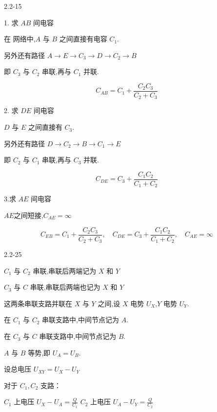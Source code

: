 \documentclass{article}
\begin{document}
2.2-15 %




1. 求 $ AB $ 间电容

在 网络中,$ A$ 与 $ B $ 之间直接有电容 $ C_1 $.  

另外还有路径 $ A \to E  \to  C_3 \to D \to C_2 \to  B $

即 $ C_3 $ 与 $ C_2 $ 串联,再与 $ C_1 $ 并联.  

$$C_{AB} = C_1 + \frac{C_2 C_3}{C_2 + C_3}$$


2. 求 $ DE $ 间电容

$ D $ 与 $ E $ 之间直接有 $ C_3 $. 
 
另外还有路径 $ D\to  C_2 \to B \to C_1 \to E $

即 $ C_2 $ 与 $ C_1 $ 串联,再与 $ C_3 $ 并联.  

$$C_{DE} = C_3 + \frac{C_1 C_2}{C_1 + C_2}$$

3.求 $ AE $ 间电容

$AE$之间短接,$C_{AE}=\infty$




$$\boxed{C_{EB} = C_1 + \frac{C_2 C_3}{C_2 + C_3}, \quad C_{DE} = C_3 + \frac{C_1 C_2}{C_1 + C_2},\quad C_{AE}=\infty}$$





\newpage

2.2-25%



$ C_1 $ 与 $ C_2 $ 串联,串联后两端记为 $ X $ 和 $ Y $

$ C_3 $ 与 $ C $ 串联,串联后两端也记为 $ X $ 和 $ Y $

这两条串联支路并联在 $ X $ 与 $ Y $ 之间,设 $ X $ 电势 $ U_X $,$ Y $ 电势 $ U_Y $.


在 $ C_1 $ 与 $ C_2 $ 串联支路中,中间节点记为 $ A $.

在 $ C_3 $ 与 $ C $ 串联支路中,中间节点记为 $ B $.

$ A $ 与 $ B $ 等势,即 $ U_A = U_B $.

设总电压 $ U_{XY} = U_X -U_Y $

对于 $ C_1, C_2 $ 支路：
  
$ C_1 $ 上电压 $ U_X - U_A = \frac{Q}{C_1} $  \qquad
$ C_2 $ 上电压 $ U_A - U_Y = \frac{Q}{C_2} $  
\end{document}
